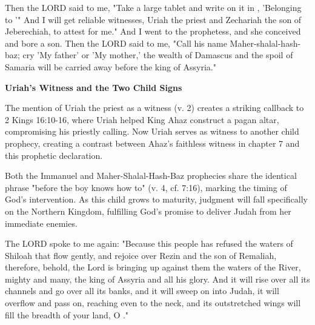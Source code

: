 \documentclass[11pt]{article}
\begin{document}
\begin{biblicaloutline}[Isaiah 8:1-4]

    \begin{versesection}{2em}
         Then the LORD said to me, "Take a large tablet and write on it in , 'Belonging to '"  And I will get reliable witnesses, Uriah the priest and Zechariah the son of Jeberechiah, to attest for me."  And I went to the prophetess, and she conceived and bore a son. Then the LORD said to me, "Call his name Maher-shalal-hash-baz;   cry 'My father' or 'My mother,' the wealth of Damascus and the spoil of Samaria will be carried away before the king of Assyria."
    \end{versesection}

\end{biblicaloutline}

\vspace{3em}
{\large\bfseries Uriah's Witness and the Two Child Signs}
\vspace{1em}

The mention of Uriah the priest as a witness (v. 2) creates a striking callback to 2 Kings 16:10-16, where Uriah helped King Ahaz construct a pagan altar, compromising his priestly calling. Now Uriah serves as witness to another child prophecy, creating a contrast between Ahaz's faithless witness in chapter 7 and this prophetic declaration.

\vspace{1em}
Both the Immanuel and Maher-Shalal-Hash-Baz prophecies share the identical phrase "before the boy knows how to" (v. 4, cf. 7:16), marking the timing of God's intervention. As this child grows to maturity, judgment will fall specifically on the Northern Kingdom, fulfilling God's promise to deliver Judah from her immediate enemies.

\begin{biblicaloutline}[Isaiah 8:5-8]

    \begin{versesection}{2em}
         The LORD spoke to me again:  "Because this people has refused the waters of Shiloah that flow gently, and rejoice over Rezin and the son of Remaliah,  therefore, behold, the Lord is bringing up against them the waters of the River, mighty and many, the king of Assyria and all his glory. And it will rise over all its channels and go over all its banks,  and it will sweep on into Judah, it will overflow and pass on, reaching even to the neck, and its outstretched wings will fill the breadth of your land, O ."
    \end{versesection}

\end{biblicaloutline}
\end{document}
